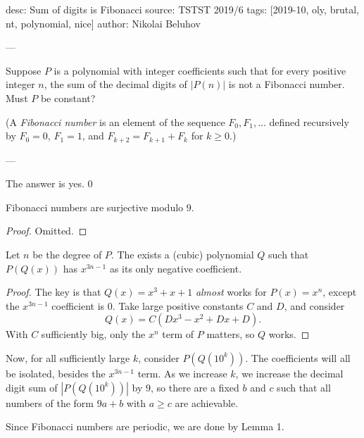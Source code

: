 desc: Sum of digits is Fibonacci
source: TSTST 2019/6
tags: [2019-10, oly, brutal, nt, polynomial, nice]
author: Nikolai Beluhov

---

Suppose $P$ is a polynomial with integer coefficients such that for every positive integer $n$, the sum of the decimal digits of $|P(n)|$ is not a Fibonacci number. Must $P$ be constant?

(A \emph{Fibonacci number} is an element of the sequence $F_0,F_1,\ldots$ defined recursively by $F_0=0$, $F_1=1$, and $F_{k+2}=F_{k+1}+F_k$ for $k\ge 0$.)

---

The answer is yes.
\setcounter{lemma}0
\begin{lemma}
    Fibonacci numbers are surjective modulo $9$.
\end{lemma}
\begin{proof}
    Omitted.
\end{proof}
\begin{lemma}
    Let $n$ be the degree of $P$. The exists a (cubic) polynomial $Q$ such that $P(Q(x))$ has $x^{3n-1}$ as its only negative coefficient.
\end{lemma}
\begin{proof}
    The key is that $Q(x)=x^3+x+1$ \emph{almost} works for $P(x)=x^n$, except the $x^{3n-1}$ coefficient is $0$. Take large positive constants $C$ and $D$, and consider \[Q(x)=C(Dx^3-x^2+Dx+D).\]
    With $C$ sufficiently big, only the $x^n$ term of $P$ matters, so $Q$ works.
\end{proof}

Now, for all sufficiently large $k$, consider $P(Q(10^k))$. The coefficients will all be isolated, besides the $x^{3n-1}$ term. As we increase $k$, we increase the decimal digit sum of $|P(Q(10^k))|$ by $9$, so there are a fixed $b$ and $c$ such that all numbers of the form $9a+b$ with $a\ge c$ are achievable.

Since Fibonacci numbers are periodic, we are done by Lemma 1.
